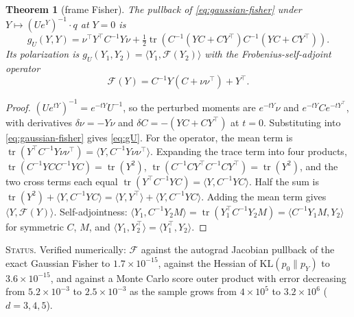 \documentclass[11pt]{article}
\newtheorem{theorem}{Theorem}[section]
\theoremstyle{definition}
\theoremstyle{remark}
\newcommand{\tr}{\operatorname{tr}}
\newcommand{\ip}[2]{\langle #1, #2\rangle}
\newcommand{\status}[1]{\par\smallskip\noindent\textsc{Status.} #1\par\smallskip}
\begin{document}
\begin{theorem}[frame Fisher]\label{thm:fisher}
The pullback of \eqref{eq:gaussian-fisher} under $Y\mapsto(Ue^{Y})^{-1}\cdot q$ at $Y=0$ is
\begin{equation}\label{eq:gU}
g_U(Y,Y)=\nu^\top Y^\top C^{-1}Y\nu+\tfrac12\tr\left(C^{-1}(YC+CY^\top)C^{-1}(YC+CY^\top)\right).
\end{equation}
Its polarization is $g_U(Y_1,Y_2)=\ip{Y_1}{\mathcal{F}(Y_2)}$ with the Frobenius-self-adjoint operator
\begin{equation}\label{eq:F}
\mathcal{F}(Y)=C^{-1}Y(C+\nu\nu^\top)+Y^\top.
\end{equation}
\end{theorem}
\begin{proof}
$(Ue^{tY})^{-1}=e^{-tY}U^{-1}$, so the perturbed moments are $e^{-tY}\nu$ and $e^{-tY}Ce^{-tY^\top}$, with derivatives $\delta\nu=-Y\nu$ and $\delta C=-(YC+CY^\top)$ at $t=0$. Substituting into \eqref{eq:gaussian-fisher} gives \eqref{eq:gU}. For the operator, the mean term is $\tr(Y^\top C^{-1}Y\nu\nu^\top)=\ip{Y}{C^{-1}Y\nu\nu^\top}$. Expanding the trace term into four products, $\tr(C^{-1}YCC^{-1}YC)=\tr(Y^2)$, $\tr(C^{-1}CY^\top C^{-1}CY^\top)=\tr(Y^2)$, and the two cross terms each equal $\tr(Y^\top C^{-1}YC)=\ip{Y}{C^{-1}YC}$. Half the sum is $\tr(Y^2)+\ip{Y}{C^{-1}YC}=\ip{Y}{Y^\top}+\ip{Y}{C^{-1}YC}$. Adding the mean term gives $\ip{Y}{\mathcal{F}(Y)}$. Self-adjointness: $\ip{Y_1}{C^{-1}Y_2M}=\tr(Y_1^\top C^{-1}Y_2M)=\ip{C^{-1}Y_1M}{Y_2}$ for symmetric $C$, $M$, and $\ip{Y_1}{Y_2^\top}=\ip{Y_1^\top}{Y_2}$.
\end{proof}
\status{Verified numerically: $\mathcal{F}$ against the autograd Jacobian pullback of the exact Gaussian Fisher to $1.7\times10^{-15}$, against the Hessian of $\mathrm{KL}(p_0\parallel p_Y)$ to $3.6\times10^{-15}$, and against a Monte Carlo score outer product with error decreasing from $5.2\times10^{-3}$ to $2.5\times10^{-3}$ as the sample grows from $4\times10^5$ to $3.2\times10^6$ ($d=3,4,5$).}
\end{document}
